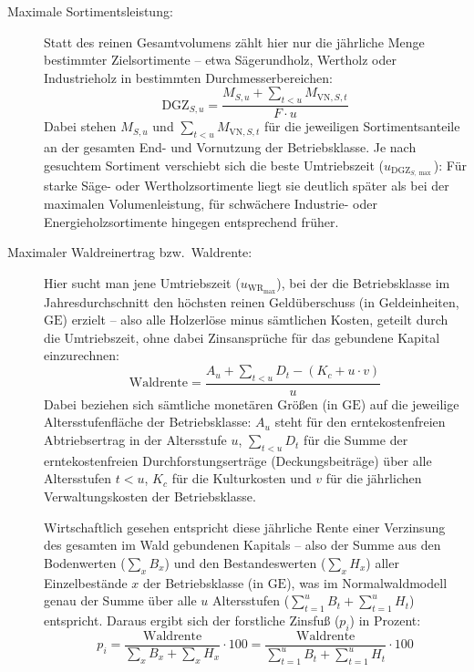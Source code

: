 \documentclass[twocolumn, paper=a4, fontsize=10pt]{scrartcl}
\begin{document}
\begin{description}
\item[Maximale Sortimentsleistung:] Statt des reinen Gesamtvolumens zählt hier nur die jährliche Menge bestimmter Zielsortimente -- etwa Sägerundholz, Wertholz oder Industrieholz in bestimmten Durchmesserbereichen:
  \begin{equation}
    \text{DGZ}_{S,u} = \frac{M_{S,u} + \sum_{t < u} M_{\text{VN},S,t}}{F \cdot u}
  \end{equation}
  Dabei stehen $M_{S,u}$ und $\sum_{t < u} M_{\text{VN},S,t}$ für die jeweiligen Sortimentsanteile an der gesamten End- und Vornutzung der Betriebsklasse. Je nach gesuchtem Sortiment verschiebt sich die beste Umtriebszeit ($u_{\text{DGZ}_{S,\max}}$): Für starke Säge- oder Wertholzsortimente liegt sie deutlich später als bei der maximalen Volumenleistung, für schwächere Industrie- oder Energieholzsortimente hingegen entsprechend früher.

\item[Maximaler Waldreinertrag bzw.\ Waldrente:] Hier sucht man jene Umtriebszeit ($u_{\text{WR}_{\max}}$), bei der die Betriebsklasse im Jahresdurchschnitt den höchsten reinen Geldüberschuss (in Geldeinheiten, $\text{GE}$) erzielt -- also alle Holzerlöse minus sämtlichen Kosten, geteilt durch die Umtriebszeit, ohne dabei Zinsansprüche für das gebundene Kapital einzurechnen:
  \begin{equation}
    \text{Waldrente} = \frac{A_u + \sum_{t < u} D_t - (K_c + u \cdot v)}{u}
  \end{equation}
  Dabei beziehen sich sämtliche monetären Größen (in $\text{GE}$) auf die jeweilige Altersstufenfläche der Betriebsklasse: $A_u$ steht für den erntekostenfreien Abtriebsertrag in der Altersstufe $u$, $\sum_{t < u} D_t$ für die Summe der erntekostenfreien Durchforstungserträge (Deckungsbeiträge) über alle Altersstufen $t < u$, $K_c$ für die Kulturkosten und $v$ für die jährlichen Verwaltungskosten der Betriebsklasse.

  Wirtschaftlich gesehen entspricht diese jährliche Rente einer Verzinsung des gesamten im Wald gebundenen Kapitals -- also der Summe aus den Bodenwerten ($\sum_{x} B_x$) und den Bestandeswerten ($\sum_{x} H_x$) aller Einzelbestände $x$ der Betriebsklasse (in $\text{GE}$), was im Normalwaldmodell genau der Summe über alle $u$ Altersstufen ($\sum_{t=1}^{u} B_t + \sum_{t=1}^{u} H_t$) entspricht. Daraus ergibt sich der forstliche Zinsfuß ($p_i$) in Prozent:
  \begin{equation}
    p_i = \frac{\text{Waldrente}}{\sum_{x} B_x + \sum_{x} H_x} \cdot 100 = \frac{\text{Waldrente}}{\sum_{t=1}^{u} B_t + \sum_{t=1}^{u} H_t} \cdot 100
  \end{equation}


\end{description}
\end{document}
